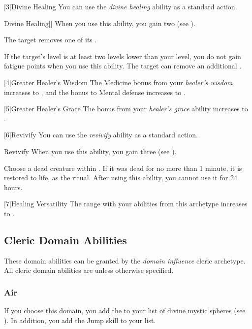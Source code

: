         [3]{Divine Healing} You can use the \textit{divine healing} ability as a standard action.
        \begin{freeability}{Divine Healing}[]
            When you use this ability, you gain two  (see ).

            The target removes one of its .

            \rankline
             If the target's level is at least two levels lower than your level,
                you do not gain fatigue points when you use this ability.
             The target can remove an additional .
        \end{freeability}

        [4]{Greater Healer's Wisdom} The Medicine bonus from your \textit{healer's wisdom} increases to , and the bonus to Mental defense increases to .

        [5]{Greater Healer's Grace} The bonus from your \textit{healer's grace} ability increases to .

        [6]{Revivify} You can use the \textit{revivify} ability as a standard action.
        \begin{freeability}{Revivify}
            When you use this ability, you gain three  (see ).

            Choose a dead creature within .
            If it was dead for no more than 1 minute, it is restored to life, as the  ritual.
            After using this ability, you cannot use it for 24 hours.
        \end{freeability}

        [7]{Healing Versatility} The range with your abilities from this archetype increases to \rngmed.

    \newpage
    \subsection{Cleric Domain Abilities}\label{Cleric Domain Abilities}
        These domain abilities can be granted by the \textit{domain influence} cleric archetype.
        All cleric domain abilities are  unless otherwise specified.

        \subsubsection{Air}
            If you choose this domain, you add the   to your list of divine mystic spheres (see ).
            In addition, you add the Jump skill to your  list.

